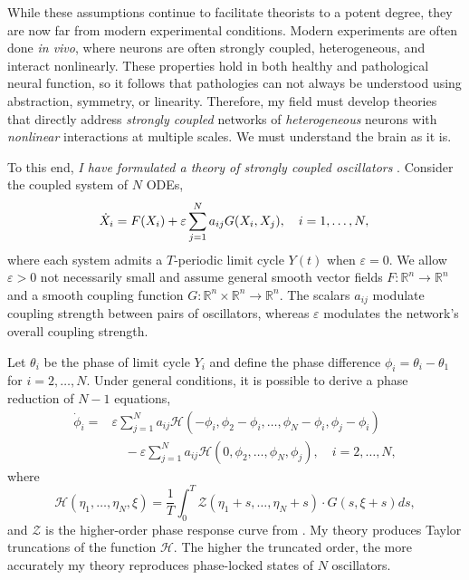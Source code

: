 \documentclass[a4paper,11pt]{article}
\newcommand{\ve}{\varepsilon}
\newcommand{\h}{\mathcal{H}}
\begin{document}
While these assumptions continue to facilitate theorists to a potent degree, they are now far from modern experimental conditions. Modern experiments are often done \textit{in vivo}, where neurons are often strongly coupled, heterogeneous, and interact nonlinearly. These properties hold in both healthy and pathological neural function, so it follows that pathologies can not always be understood using abstraction, symmetry, or linearity. Therefore, my field must develop theories that directly address \textit{strongly coupled} networks of \textit{heterogeneous} neurons with \textit{nonlinear} interactions at multiple scales. We must understand the brain as it is.

To this end, \textit{I have formulated a theory of strongly coupled oscillators} \cite{park2020high}. Consider the coupled system of $N$ ODEs,
\begin{equation}\label{eq:odes}
\dot X_i = F(X_i) +\ve \sum_{j=1}^N a_{ij} G(X_i,X_j), \quad i=1,\ldots,N,\\
\end{equation}
where each system admits a $T$-periodic limit cycle $Y(t)$ when $\ve=0$. We allow $\ve>0$ not necessarily small and assume general smooth vector fields $F:\mathbb{R}^n \rightarrow \mathbb{R}^n$ and a smooth coupling function $G:\mathbb{R}^n\times\mathbb{R}^n\rightarrow \mathbb{R}^n$. The scalars $a_{ij}$ modulate coupling strength between pairs of oscillators, whereas $\ve$ modulates the network's overall coupling strength.

Let $\theta_i$ be the phase of limit cycle $Y_i$ and define the phase difference $\phi_i=\theta_i-\theta_1$ for $i=2,\ldots,N$. Under general conditions, it is possible to derive a phase reduction of $N-1$ equations,
\begin{align*}
\dot \phi_i =& \ve\sum_{j=1}^N a_{ij} \h(-\phi_i,\phi_2-\phi_i,\ldots,\phi_N-\phi_i,\phi_j-\phi_i)\\
&\quad- \ve\sum_{j=1}^N a_{ij} \h(0,\phi_2,\ldots,\phi_N,\phi_j), \quad i=2,\ldots,N,
\end{align*}
where
\begin{equation*}
\h(\eta_1,\ldots,\eta_N,\xi) = \frac{1}{T} \int_0^T \mathcal{Z}(\eta_1+s,\ldots,\eta_N+s) \cdot G(s,\xi+s)ds,
\end{equation*}
and $\mathcal{Z}$ is the higher-order phase response curve from \cite{wilson2020phase}. My theory produces Taylor truncations of the function $\h$. The higher the truncated order, the more accurately my theory reproduces phase-locked states of $N$ oscillators.
\end{document}
